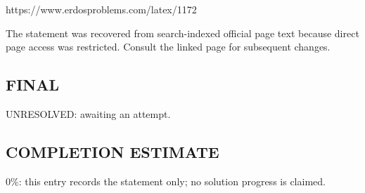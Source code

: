 https://www.erdosproblems.com/latex/1172

The statement was recovered from search-indexed official page text because direct page access was restricted. Consult the linked page for subsequent changes.

\subsection*{FINAL}
UNRESOLVED: awaiting an attempt.

\subsection*{COMPLETION ESTIMATE}
$0\%$: this entry records the statement only; no solution progress is claimed.
